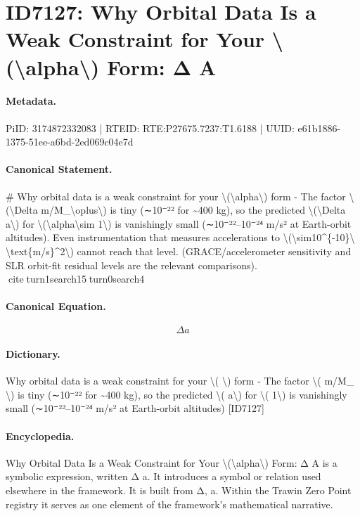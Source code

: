 \section*{ID7127: Why Orbital Data Is a Weak Constraint for Your \textbackslash{}(\textbackslash{}alpha\textbackslash{}) Form: Δ A}
\paragraph{Metadata.}
PiID: 3174872332083 | RTEID: RTE:P27675.7237:T1.6188 | UUID: e61b1886-1375-51ee-a6bd-2ed069c04e7d

\paragraph{Canonical Statement.}
\# Why orbital data is a weak constraint for your \textbackslash{}(\textbackslash{}alpha\textbackslash{}) form - The factor \textbackslash{}(\textbackslash{}Delta m/M\_\textbackslash{}oplus\textbackslash{}) is tiny (∼10⁻²² for \textasciitilde{}400 kg), so the predicted \textbackslash{}(\textbackslash{}Delta a\textbackslash{}) for \textbackslash{}(\textbackslash{}alpha\textbackslash{}sim 1\textbackslash{}) is vanishingly small (∼10⁻²²–10⁻²⁴ m/s² at Earth-orbit altitudes). Even instrumentation that measures accelerations to \textbackslash{}(\textbackslash{}sim10\textasciicircum{}\{-10\}\textbackslash{} \textbackslash{}text\{m/s\}\textasciicircum{}2\textbackslash{}) cannot reach that level. (GRACE/accelerometer sensitivity and SLR orbit-fit residual levels are the relevant comparisons). citeturn1search15turn0search4

\paragraph{Canonical Equation.}
\[
\Delta a
\]

\paragraph{Dictionary.}
Why orbital data is a weak constraint for your \textbackslash{}( \textbackslash{}) form - The factor \textbackslash{}( m/M\_ \textbackslash{}) is tiny (∼10⁻²² for \textasciitilde{}400 kg), so the predicted \textbackslash{}( a\textbackslash{}) for \textbackslash{}( 1\textbackslash{}) is vanishingly small (∼10⁻²²–10⁻²⁴ m/s² at Earth-orbit altitudes) [ID7127]

\paragraph{Encyclopedia.}
Why Orbital Data Is a Weak Constraint for Your \textbackslash{}(\textbackslash{}alpha\textbackslash{}) Form: Δ A is a symbolic expression, written Δ a. It introduces a symbol or relation used elsewhere in the framework. It is built from Δ, a. Within the Trawin Zero Point registry it serves as one element of the framework's mathematical narrative.
